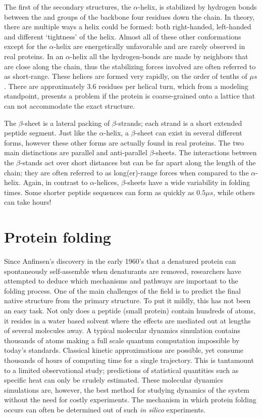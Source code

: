 The first of the secondary structures, the $\alpha$-helix, is stabilized by hydrogen bonds between the  and  groups of the backbone four residues down the chain. In theory, there are multiple ways a helix could be formed: both right-handed, left-handed and different `tightness' of the helix. Almost all of these other conformations except for the $\alpha$-helix are energetically unfavorable and are rarely observed in real proteins. In an $\alpha$-helix all the hydrogen-bonds are made by neighbors that are close along the chain, thus the stabilizing forces involved are often referred to as short-range. These helices are formed very rapidly, on the order of tenths of $\mu s$. There are approximately 3.6 residues per helical turn, which from a modeling standpoint, presents a problem if the protein is coarse-grained onto a lattice that can not accommodate the exact structure.

The $\beta$-sheet is a lateral packing of $\beta$-strands; each strand is a short extended peptide segment. Just like the $\alpha$-helix, a $\beta$-sheet can exist in several different forms, however these other forms are actually found in real proteins. The two main distinctions are parallel and anti-parallel $\beta$-sheets. The interactions between the $\beta$-stands act over short distances but can be far apart along the length of the chain; they are often referred to as long(er)-range forces when compared to the $\alpha$-helix. Again, in contrast to $\alpha$-helices, $\beta$-sheets  have a wide variability in folding times. Some shorter peptide sequences can form as quickly as $0.5\mu s$, while others can take hours!\cite{xu_probing_2008} 

\section{Protein folding}
Since Anfinsen's discovery in the early 1960's that a denatured protein can spontaneously self-assemble when denaturants are removed,\cite{anfinsen_kinetics_1961} researchers have attempted to deduce which mechanisms and pathways are important to the folding process. One of the main challenges of the field is to predict the final native structure from the primary structure. To put it mildly, this has not been an easy task. Not only does a peptide (small protein) contain hundreds of atoms, it resides in a water based solvent where the effects are mediated out at lengths of several molecules away. A typical molecular dynamics simulation contains thousands of atoms making a full scale quantum computation impossible by today’s standards. Classical kinetic approximations are possible, yet consume thousands of hours of computing time for a single trajectory. This is tantamount to a limited observational study; predictions of statistical quantities such as specific heat can only be crudely estimated. These molecular dynamics simulations are, however, the best method for studying dynamics of the system without the need for costly experiments. The mechanism in which protein folding occurs can often be determined out of such \textit{in silico} experiments. 

